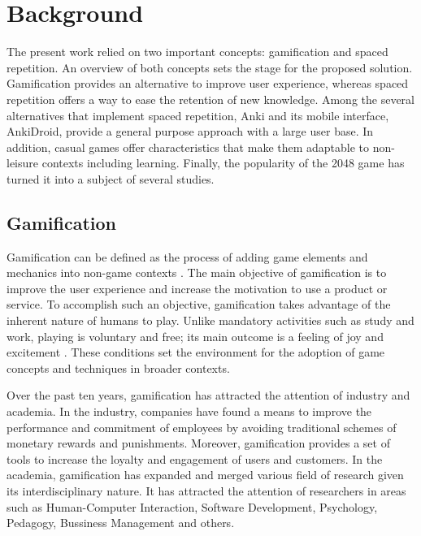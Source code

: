 
\chapter{Background} %

\label{back} %

The present work relied on two important concepts: gamification and spaced repetition. An overview of both concepts sets the stage for the proposed solution. Gamification provides an alternative to improve user experience, whereas spaced repetition offers a way to ease the retention of new knowledge. Among the several alternatives that implement spaced repetition, Anki and its mobile interface, AnkiDroid, provide a general purpose approach with a large user base. In addition, casual games offer characteristics that make them adaptable to non-leisure contexts including learning. Finally, the popularity of the 2048 game \citep{uberspot2017game} has turned it into a subject of several studies.

\section{Gamification}
Gamification can be defined as the process of adding game elements and mechanics into non-game contexts \citep{deterding2011game}. The main objective of gamification is to improve the user experience and increase the motivation to use a product or service. To accomplish such an objective, gamification takes advantage of the inherent nature of humans to play. Unlike mandatory activities such as study and work, playing is voluntary and free; its main outcome is a feeling of joy and excitement \citep{johan1950homo}. These conditions set the environment for the adoption of game concepts and techniques in broader contexts.

Over the past ten years, gamification has attracted the attention of industry and academia. In the industry, companies have found a means to improve the performance and commitment of employees by avoiding traditional schemes of monetary rewards and punishments. Moreover, gamification provides a set of tools to increase the loyalty and engagement of users and customers. In the academia, gamification has expanded and merged various field of research given its interdisciplinary nature. It has attracted the attention of researchers in areas such as Human-Computer Interaction, Software Development, Psychology, Pedagogy, Bussiness Management and others.

